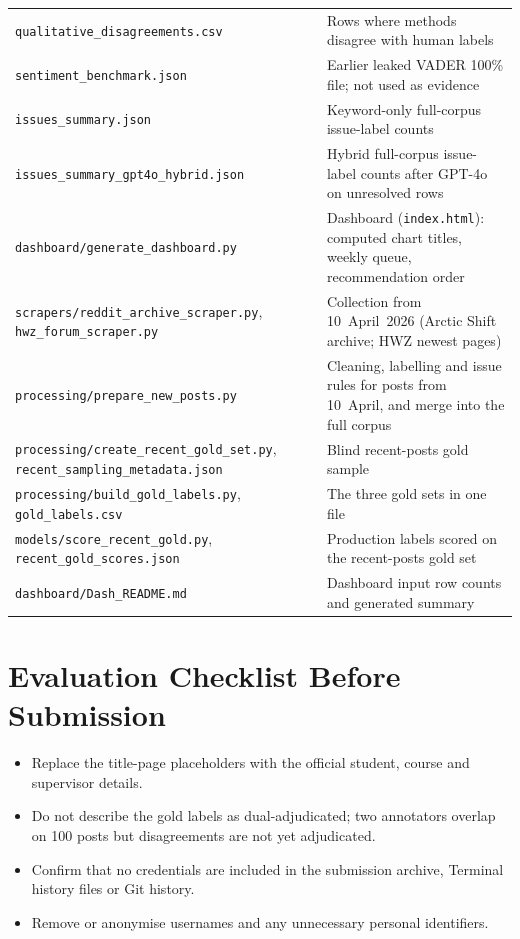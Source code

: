 \documentclass[11pt,a4paper]{article}
\begin{document}
\begin{longtable}{@{}p{}p{}@{}}
\texttt{qualitative\_disagreements.csv} & Rows where methods disagree with human labels \\
\texttt{sentiment\_benchmark.json} & Earlier leaked VADER 100\% file; not used as evidence \\
\texttt{issues\_summary.json} & Keyword-only full-corpus issue-label counts \\
\texttt{issues\_summary\_gpt4o\_hybrid.json} & Hybrid full-corpus issue-label counts after GPT-4o on unresolved rows \\
\texttt{dashboard/generate\_dashboard.py} & Dashboard (\texttt{index.html}): computed chart titles, weekly queue, recommendation order \\
\texttt{scrapers/reddit\_archive\_scraper.py}, \texttt{hwz\_forum\_scraper.py} & Collection from 10~April~2026 (Arctic Shift archive; HWZ newest pages) \\
\texttt{processing/prepare\_new\_posts.py} & Cleaning, labelling and issue rules for posts from 10~April, and merge into the full corpus \\
\texttt{processing/create\_recent\_gold\_set.py}, \texttt{recent\_sampling\_metadata.json} & Blind recent-posts gold sample \\
\texttt{processing/build\_gold\_labels.py}, \texttt{gold\_labels.csv} & The three gold sets in one file \\
\texttt{models/score\_recent\_gold.py}, \texttt{recent\_gold\_scores.json} & Production labels scored on the recent-posts gold set \\
\texttt{dashboard/Dash\_README.md} & Dashboard input row counts and generated summary \\
\bottomrule
\end{longtable}

\section{Evaluation Checklist Before Submission}

\begin{itemize}
  \item Replace the title-page placeholders with the official student, course and supervisor details.
  \item Do not describe the gold labels as dual-adjudicated; two annotators overlap on 100 posts but disagreements are not yet adjudicated.
  \item Confirm that no credentials are included in the submission archive, Terminal history files or Git history.
  \item Remove or anonymise usernames and any unnecessary personal identifiers.
\end{itemize}
\end{document}
